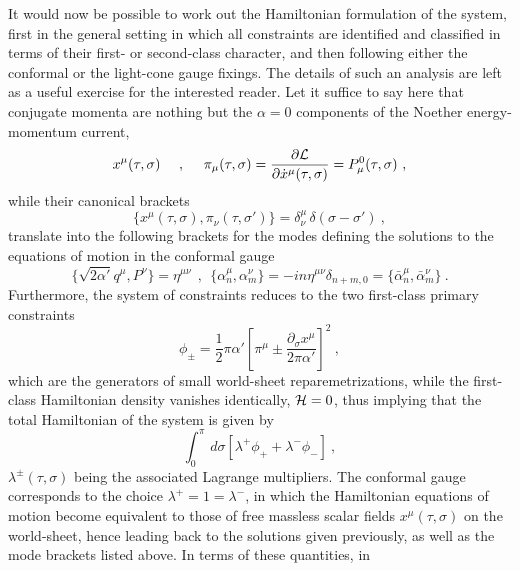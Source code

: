 \documentclass[a4paper,11pt]{article}
\begin{document}
\vspace{10pt}

It would now be possible to work out the Hamiltonian formulation of the
system, first in the general setting in which all constraints are
identified and classified in terms of their first- or second-class character,
and then following either the conformal or the light-cone gauge fixings.
The details of such an analysis are left as a useful exercise for the
interested reader.\cite{JG10,JG11} Let it suffice to say here that conjugate 
momenta are nothing but the $\alpha=0$ components of the Noether 
energy-momentum current,
\begin{equation}
x^\mu(\tau,\sigma)\ \ \ \ ,\ \ \ \ 
\pi_\mu(\tau,\sigma)=\frac{\partial{\cal L}}{\partial\dot{x}^\mu(\tau,\sigma)}
=P^0_\mu(\tau,\sigma)\ ,
\end{equation}
while their canonical brackets
\begin{equation}
\{x^\mu(\tau,\sigma),\pi_\nu(\tau,\sigma')\}=\delta^\mu_\nu\,
\delta(\sigma-\sigma')\ ,
\end{equation}
translate into the following brackets for the modes defining the solutions
to the equations of motion in the conformal gauge
\begin{equation}
\{\sqrt{2\alpha'}q^\mu,P^\nu\}=\eta^{\mu\nu}\ \ ,\ \ 
\{\alpha^\mu_n,\alpha^\nu_m\}=-in\eta^{\mu\nu}\delta_{n+m,0}=
\{\bar{\alpha}^\mu_n,\bar{\alpha}^\nu_m\}\ .
\end{equation}
Furthermore, the system of constraints reduces to the two first-class 
primary constraints
\begin{equation}
\phi_\pm=\frac{1}{2}\pi\alpha'
\left[\pi^\mu\pm\frac{\partial_\sigma x^\mu}{2\pi\alpha'}\right]^2\ ,
\end{equation}
which are the generators of small world-sheet reparemetrizations,
while the first-class Hamiltonian density vanishes identically, ${\cal H}=0$,
thus implying that the total Hamiltonian of the system is given by
\begin{equation}
\int_0^\pi\,d\sigma\left[\lambda^+\phi_++\lambda^-\phi_-\right]\ ,
\end{equation}
$\lambda^\pm(\tau,\sigma)$ being the associated Lagrange
multipliers. The conformal gauge corresponds to the choice 
$\lambda^+=1=\lambda^-$, in which the Hamiltonian equations of motion
become equivalent to those of free massless scalar fields $x^\mu(\tau,\sigma)$
on the world-sheet, hence leading back to the solutions given previously,
as well as the mode brackets listed above. In terms of these quantities, in 
\end{document}
